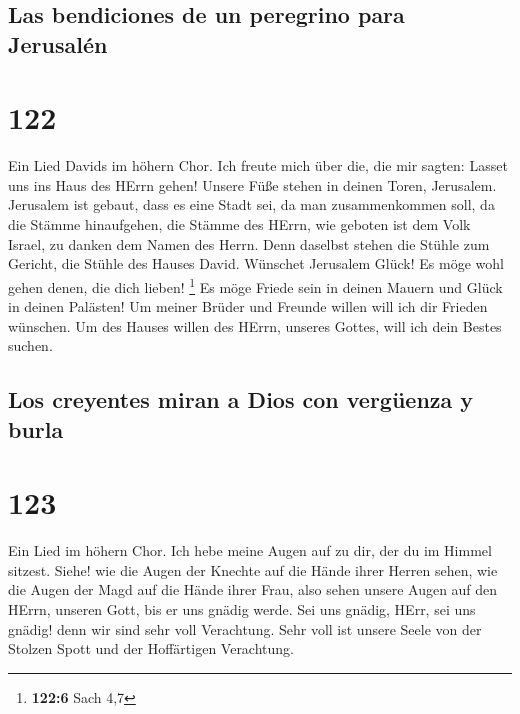 \hypertarget{las-bendiciones-de-un-peregrino-para-jerusaluxe9n}{%
\subsection{Las bendiciones de un peregrino para
Jerusalén}\label{las-bendiciones-de-un-peregrino-para-jerusaluxe9n}}

\hypertarget{section-121}{%
\section{122}\label{section-121}}

 Ein Lied Davids im höhern Chor. Ich freute mich über die,
die mir sagten: Lasset uns ins Haus des HErrn gehen! 
Unsere Füße stehen in deinen Toren, Jerusalem.  Jerusalem
ist gebaut, dass es eine Stadt sei, da man zusammenkommen soll,
 da die Stämme hinaufgehen, die Stämme des HErrn, wie
geboten ist dem Volk Israel, zu danken dem Namen des Herrn.
 Denn daselbst stehen die Stühle zum Gericht, die Stühle
des Hauses David.  Wünschet Jerusalem Glück! Es möge wohl
gehen denen, die dich lieben! \footnote{\textbf{122:6} Sach 4,7}
 Es möge Friede sein in deinen Mauern und Glück in deinen
Palästen!  Um meiner Brüder und Freunde willen will ich
dir Frieden wünschen.  Um des Hauses willen des HErrn,
unseres Gottes, will ich dein Bestes suchen.

\hypertarget{los-creyentes-miran-a-dios-con-verguxfcenza-y-burla}{%
\subsection{Los creyentes miran a Dios con vergüenza y
burla}\label{los-creyentes-miran-a-dios-con-verguxfcenza-y-burla}}

\hypertarget{section-122}{%
\section{123}\label{section-122}}

 Ein Lied im höhern Chor. Ich hebe meine Augen auf zu dir,
der du im Himmel sitzest.  Siehe! wie die Augen der
Knechte auf die Hände ihrer Herren sehen, wie die Augen der Magd auf die
Hände ihrer Frau, also sehen unsere Augen auf den HErrn, unseren Gott,
bis er uns gnädig werde.  Sei uns gnädig, HErr, sei uns
gnädig! denn wir sind sehr voll Verachtung.  Sehr voll ist
unsere Seele von der Stolzen Spott und der Hoffärtigen Verachtung.

